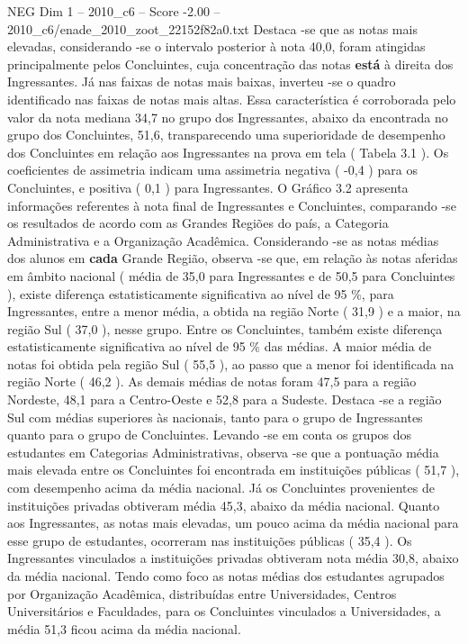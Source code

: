\begin{textsample}{NEG Dim 1 – 2010\_c6 – Score -2.00 – 2010\_c6/enade\_2010\_zoot\_22152f82a0.txt}
Destaca -se que as notas mais elevadas, considerando -se o intervalo posterior à nota 40,0, foram atingidas principalmente pelos Concluintes, cuja concentração das notas \textbf{está} à direita dos Ingressantes.
Já nas faixas de notas mais baixas, inverteu -se o quadro identificado nas faixas de notas mais altas.
Essa característica é corroborada pelo valor da nota mediana 34,7 no grupo dos Ingressantes, abaixo da encontrada no grupo dos Concluintes, 51,6, transparecendo uma superioridade de desempenho dos Concluintes em relação aos Ingressantes na prova em tela ( Tabela 3.1 ).
Os coeficientes de assimetria indicam uma assimetria negativa ( -0,4 ) para os Concluintes, e positiva ( 0,1 ) para Ingressantes.
O Gráfico 3.2 apresenta informações referentes à nota final de Ingressantes e Concluintes, comparando -se os resultados de acordo com as Grandes Regiões do país, a Categoria Administrativa e a Organização Acadêmica.
Considerando -se as notas médias dos alunos em \textbf{cada} Grande Região, observa -se que, em relação às notas aferidas em âmbito nacional ( média de 35,0 para Ingressantes e de 50,5 para Concluintes ), existe diferença estatisticamente significativa ao nível de 95 \%, para Ingressantes, entre a menor média, a obtida na região Norte ( 31,9 ) e a maior, na região Sul ( 37,0 ), nesse grupo.
Entre os Concluintes, também existe diferença estatisticamente significativa ao nível de 95 \% das médias.
A maior média de notas foi obtida pela região Sul ( 55,5 ), ao passo que a menor foi identificada na região Norte ( 46,2 ).
As demais médias de notas foram 47,5 para a região Nordeste, 48,1 para a Centro-Oeste e 52,8 para a Sudeste.
Destaca -se a região Sul com médias superiores às nacionais, tanto para o grupo de Ingressantes quanto para o grupo de Concluintes.
Levando -se em conta os grupos dos estudantes em Categorias Administrativas, observa -se que a pontuação média mais elevada entre os Concluintes foi encontrada em instituições públicas ( 51,7 ), com desempenho acima da média nacional.
Já os Concluintes provenientes de instituições privadas obtiveram média 45,3, abaixo da média nacional.
Quanto aos Ingressantes, as notas mais elevadas, um pouco acima da média nacional para esse grupo de estudantes, ocorreram nas instituições públicas ( 35,4 ).
Os Ingressantes vinculados a instituições privadas obtiveram nota média 30,8, abaixo da média nacional.
Tendo como foco as notas médias dos estudantes agrupados por Organização Acadêmica, distribuídas entre Universidades, Centros Universitários e Faculdades, para os Concluintes vinculados a Universidades, a média 51,3 ficou acima da média nacional.

\end{textsample}
